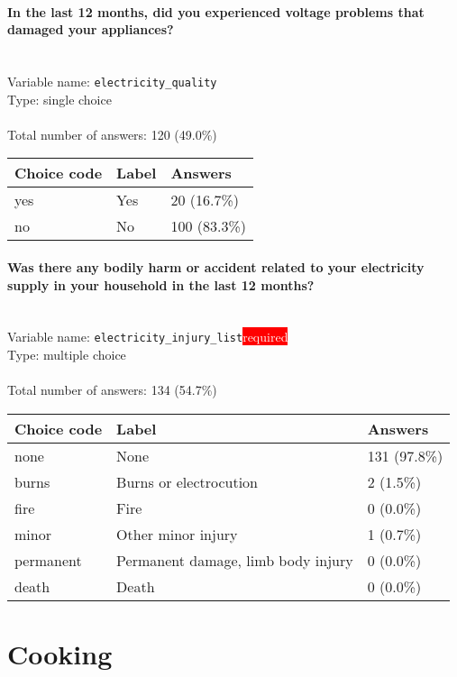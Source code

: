 \documentclass[11.5pt, a4paper]{scrartcl}
\begin{document}
\paragraph{In the last 12 months, did you experienced voltage problems that damaged your appliances?}
\  \\Variable name: \texttt{electricity\_quality}\\
Type: single choice\\
\\Total number of answers: 120 (49.0\%)
\\[0.2em] \begin{tabular}{p{4cm}|p{8cm}|p{3cm}}
Choice code & Label & Answers \\
\hline
yes & Yes& \cellcolor{color0}20 (16.7\%)\\
\cellcolor{mygray} no & \cellcolor{mygray}No & \cellcolor{color4}100 (83.3\%)\\
\end{tabular}
\paragraph{Was there any bodily harm or accident related to your electricity supply in your household in the last 12 months?}
\  \\Variable name: \texttt{electricity\_injury\_list}\hfill\colorbox{red}{\small{\textcolor{white}{required}}}\\
 Type: multiple choice\\
\\Total number of answers: 134 (54.7\%)
\\[0.2em] \begin{tabular}{p{4cm}|p{8cm}|p{3cm}}
Choice code & Label & Answers \\
\hline
none & None& \cellcolor{color4}131 (97.8\%)\\
\cellcolor{mygray} burns & \cellcolor{mygray}Burns or electrocution & \cellcolor{color0}2 (1.5\%)\\
fire & Fire & \cellcolor{color0}0 (0.0\%)\\
\cellcolor{mygray} minor & \cellcolor{mygray}Other minor injury & \cellcolor{color0}1 (0.7\%)\\
permanent & Permanent damage, limb body injury& \cellcolor{color0}0 (0.0\%)\\
\cellcolor{mygray} death & \cellcolor{mygray}Death & \cellcolor{color0}0 (0.0\%)\\
\end{tabular}
\newpage\section{Cooking}
\end{document}
